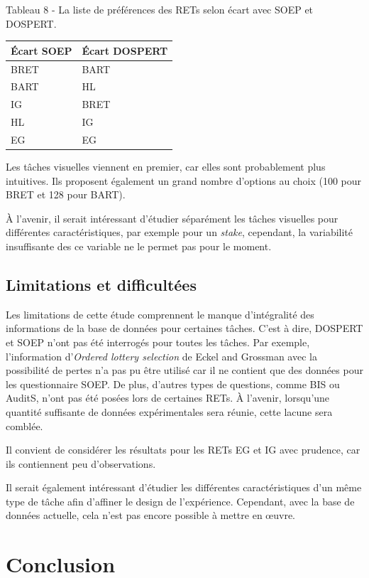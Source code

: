 \documentclass[12pt]{article}
\begin{document}
Tableau 8 - La liste de préférences des RETs selon écart avec SOEP et
DOSPERT.

\begin{longtable}[]{@{}ll@{}}
\toprule()
Écart SOEP & Écart DOSPERT \\
\midrule()
\endhead
BRET & BART \\
BART & HL \\
IG & BRET \\
HL & IG \\
EG & EG \\
\bottomrule()
\end{longtable}

Les tâches visuelles viennent en premier, car elles sont probablement
plus intuitives. Ils proposent également un grand nombre d'options au
choix (100 pour BRET et 128 pour BART).

À l'avenir, il serait intéressant d'étudier séparément les tâches
visuelles pour différentes caractéristiques, par exemple pour un
\emph{stake}, cependant, la variabilité insuffisante des ce variable ne
le permet pas pour le moment.

\subsection{Limitations et difficultées}

Les limitations de cette étude comprennent le manque d'intégralité des
informations de la base de données pour certaines tâches. C'est à dire,
DOSPERT et SOEP n'ont pas été interrogés pour toutes les tâches. Par
exemple, l'information d'\emph{Ordered lottery selection} de Eckel and
Grossman avec la possibilité de pertes n'a pas pu être utilisé car il ne
contient que des données pour les questionnaire SOEP. De plus, d'autres
types de questions, comme BIS ou AuditS, n'ont pas été posées lors de
certaines RETs. À l'avenir, lorsqu'une quantité suffisante de données
expérimentales sera réunie, cette lacune sera comblée.

Il convient de considérer les résultats pour les RETs EG et IG avec
prudence, car ils contiennent peu d'observations.

Il serait également intéressant d'étudier les différentes
caractéristiques d'un même type de tâche afin d'affiner le design de
l'expérience. Cependant, avec la base de données actuelle, cela n'est
pas encore possible à mettre en œuvre.

\section{Conclusion}
\end{document}
